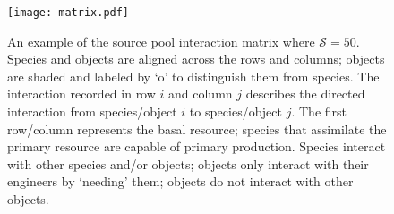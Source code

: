 \documentclass[9pt,twocolumn,twoside]{pnas-new}
\begin{document}
\begin{figure}
\centering
\texttt{[image: matrix.pdf]}
\caption{
An example of the source pool interaction matrix where $\mathcal{S} = 50$. Species and objects are aligned across the rows and columns; objects are shaded and labeled by `o' to distinguish them from species. The interaction recorded in row $i$ and column $j$ describes the directed interaction from species/object $i$ to species/object $j$. The first row/column represents the basal resource; species that assimilate the primary resource are capable of primary production. Species interact with other species and/or objects; objects only interact with their engineers by `needing' them; objects do not interact with other objects.
}
\label{fig:matrix}
\end{figure}
\end{document}
